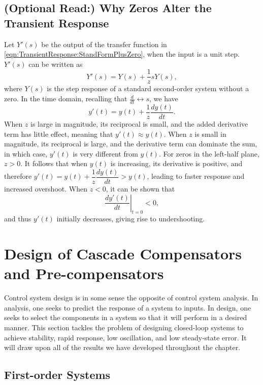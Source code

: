 \subsection{(Optional Read:) Why Zeros Alter the Transient Response}

Let ${Y}'(s)$ be the output of the transfer function in \eqref{eqn:TransientResponse:StandFormPlusZero}, when the input is a unit step. ${Y}'(s)$ can be written as
$$ {Y}'(s) = Y(s) + \frac{1}{z} s Y(s),$$
where $Y(s)$ is the step response of a standard second-order system without a zero.
In the time domain, recalling that $\frac{d}{dt} \leftrightarrow s$, we have
$$ {y}'(t) = y(t) +  \frac{1}{z} \frac{dy(t)}{dt}.$$
When $z$ is large in magnitude, its reciprocal is small, and  the added derivative term has little effect, meaning that ${y}'(t) \approx y(t).$ When $z$ is small in magnitude, its reciprocal is large, and  the derivative term can dominate the sum, in which case, ${y}'(t)$ is very different from $y(t).$ For zeros in the left-half plane, $z>0$. It follows that when $y(t)$ is increasing, its derivative is positive, and therefore ${y}'(t)= y(t) +  \dfrac{1}{z} \dfrac{dy(t)}{dt} > y(t)$, leading to faster response and increased overshoot. When $z<0$, it can be shown that
$$\left. \frac{d{y}'(t)}{dt} \right|_{t=0}<0,$$
and thus ${y}'(t)$ initially decreases, giving rise to undershooting.






\section{Design of Cascade Compensators and Pre-compensators}
\label{sec:feedback:CascadeDesign} 



Control system design is in some sense the opposite of control system analysis. In analysis, one seeks to predict the response of a system to inputs. In design, one seeks to select the components in a system so that it will perform in a desired manner. This section tackles the problem of designing closed-loop systems to achieve stability, rapid response, low oscillation, and low steady-state error. It will draw upon all of the results we have developed throughout the chapter.


\subsection{First-order Systems}
\label{sec:CascadeDesign:FirstOrder}

